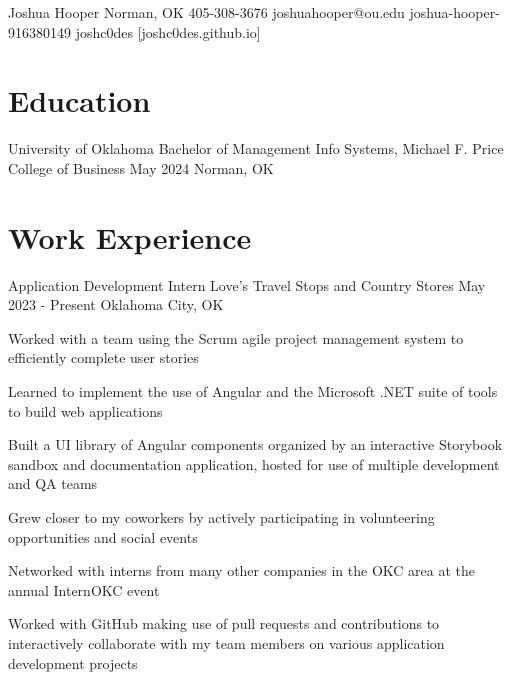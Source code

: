 \documentclass[letterpaper]{resumeconfig}
\begin{document}
\Header
    {Joshua Hooper} %
    {Norman, OK} %
    {405-308-3676} %
    {joshuahooper@ou.edu} %
    {joshua-hooper-916380149} %
    {joshc0des} %
    [joshc0des.github.io] %


\section{Education}

\Education
    {University of Oklahoma} %
    {Bachelor of Management Info Systems, Michael F. Price College of Business} %
    {May 2024} %
    {Norman, OK} %
    \vspace{-1em}


\section{Work Experience}

\WorkExperience
    {Application Development Intern} %
    {Love's Travel Stops and Country Stores} %
    {May 2023 - Present} %
    {Oklahoma City, OK} %
    {
        \item Worked with a team using the Scrum agile project management system to efficiently complete user stories
        \item Learned to implement the use of Angular and the Microsoft .NET suite of tools to build web applications
        \item Built a UI library of Angular components organized by an interactive Storybook sandbox and documentation application, hosted for use of multiple development and QA teams
        \item Grew closer to my coworkers by actively participating in volunteering opportunities and social events
        \item Networked with interns from many other companies in the OKC area at the annual InternOKC event
        \item Worked with GitHub making use of pull requests and contributions to interactively collaborate with my team members on various application development projects
    }
    \vspace{1em}
\end{document}
